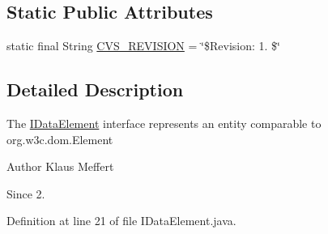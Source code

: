 \subsection*{Static Public Attributes}
\begin{DoxyCompactItemize}
\item 
static final String \hyperlink{interfaceorg_1_1jgap_1_1data_1_1_i_data_element_aefd058cd0d971f0cd9b0e85c1895dd40}{C\-V\-S\-\_\-\-R\-E\-V\-I\-S\-I\-O\-N} = \char`\"{}\$Revision\-: 1. \$\char`\"{}
\end{DoxyCompactItemize}


\subsection{Detailed Description}
The \hyperlink{interfaceorg_1_1jgap_1_1data_1_1_i_data_element}{I\-Data\-Element} interface represents an entity comparable to org.\-w3c.\-dom.\-Element

\begin{DoxyAuthor}{Author}
Klaus Meffert 
\end{DoxyAuthor}
\begin{DoxySince}{Since}
2. 
\end{DoxySince}


Definition at line 21 of file I\-Data\-Element.\-java.



